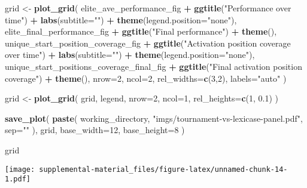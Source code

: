\documentclass[]{book}
\newenvironment{Shaded}{\begin{snugshade}}{\end{snugshade}}
\newcommand{\DataTypeTok}[1]{\textcolor[rgb]{0.13,0.29,0.53}{#1}}
\newcommand{\DecValTok}[1]{\textcolor[rgb]{0.00,0.00,0.81}{#1}}
\newcommand{\FloatTok}[1]{\textcolor[rgb]{0.00,0.00,0.81}{#1}}
\newcommand{\KeywordTok}[1]{\textcolor[rgb]{0.13,0.29,0.53}{\textbf{#1}}}
\newcommand{\NormalTok}[1]{#1}
\newcommand{\OperatorTok}[1]{\textcolor[rgb]{0.81,0.36,0.00}{\textbf{#1}}}
\newcommand{\StringTok}[1]{\textcolor[rgb]{0.31,0.60,0.02}{#1}}
\begin{document}
\begin{Shaded}
\begin{Highlighting}[]
\NormalTok{grid <-}\StringTok{ }\KeywordTok{plot_grid}\NormalTok{(}
\NormalTok{  elite_ave_performance_fig }\OperatorTok{+}
\StringTok{    }\KeywordTok{ggtitle}\NormalTok{(}\StringTok{"Performance over time"}\NormalTok{) }\OperatorTok{+}
\StringTok{    }\KeywordTok{labs}\NormalTok{(}\DataTypeTok{subtitle=}\StringTok{""}\NormalTok{) }\OperatorTok{+}
\StringTok{    }\KeywordTok{theme}\NormalTok{(}\DataTypeTok{legend.position=}\StringTok{"none"}\NormalTok{),}
\NormalTok{  elite_final_performance_fig }\OperatorTok{+}
\StringTok{    }\KeywordTok{ggtitle}\NormalTok{(}\StringTok{"Final performance"}\NormalTok{) }\OperatorTok{+}
\StringTok{    }\KeywordTok{theme}\NormalTok{(),}
\NormalTok{  unique_start_position_coverage_fig }\OperatorTok{+}
\StringTok{    }\KeywordTok{ggtitle}\NormalTok{(}\StringTok{"Activation position coverage over time"}\NormalTok{) }\OperatorTok{+}
\StringTok{    }\KeywordTok{labs}\NormalTok{(}\DataTypeTok{subtitle=}\StringTok{""}\NormalTok{) }\OperatorTok{+}
\StringTok{    }\KeywordTok{theme}\NormalTok{(}\DataTypeTok{legend.position=}\StringTok{"none"}\NormalTok{),}
\NormalTok{  unique_start_positions_coverage_final_fig }\OperatorTok{+}
\StringTok{    }\KeywordTok{ggtitle}\NormalTok{(}\StringTok{"Final activation position coverage"}\NormalTok{) }\OperatorTok{+}
\StringTok{    }\KeywordTok{theme}\NormalTok{(),}
  \DataTypeTok{nrow=}\DecValTok{2}\NormalTok{,}
  \DataTypeTok{ncol=}\DecValTok{2}\NormalTok{,}
  \DataTypeTok{rel_widths=}\KeywordTok{c}\NormalTok{(}\DecValTok{3}\NormalTok{,}\DecValTok{2}\NormalTok{),}
  \DataTypeTok{labels=}\StringTok{"auto"}
\NormalTok{)}

\NormalTok{grid <-}\StringTok{ }\KeywordTok{plot_grid}\NormalTok{(}
\NormalTok{  grid,}
\NormalTok{  legend,}
  \DataTypeTok{nrow=}\DecValTok{2}\NormalTok{,}
  \DataTypeTok{ncol=}\DecValTok{1}\NormalTok{,}
  \DataTypeTok{rel_heights=}\KeywordTok{c}\NormalTok{(}\DecValTok{1}\NormalTok{, }\FloatTok{0.1}\NormalTok{)}
\NormalTok{)}

\KeywordTok{save_plot}\NormalTok{(}
  \KeywordTok{paste}\NormalTok{(}
\NormalTok{    working_directory,}
    \StringTok{"imgs/tournament-vs-lexicase-panel.pdf"}\NormalTok{,}
    \DataTypeTok{sep=}\StringTok{""}
\NormalTok{  ),}
\NormalTok{  grid,}
  \DataTypeTok{base_width=}\DecValTok{12}\NormalTok{,}
  \DataTypeTok{base_height=}\DecValTok{8}
\NormalTok{)}

\NormalTok{grid}
\end{Highlighting}
\end{Shaded}

\texttt{[image: supplemental-material\_files/figure-latex/unnamed-chunk-14-1.pdf]}
\end{document}
